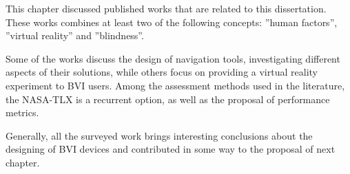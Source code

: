 This chapter discussed published works that are related to this dissertation. These works combines at least two of the following concepts: ”human factors”, ”virtual reality” and ”blindness”. 

Some of the works discuss the design of navigation tools, investigating different aspects of their solutions, while others focus on providing a virtual reality experiment to BVI users. Among the assessment methods used in the literature, the NASA-TLX is a recurrent option, as well as the proposal of performance metrics.

Generally, all the surveyed work brings interesting conclusions about the designing of BVI devices and contributed in some way to the proposal of next chapter.

